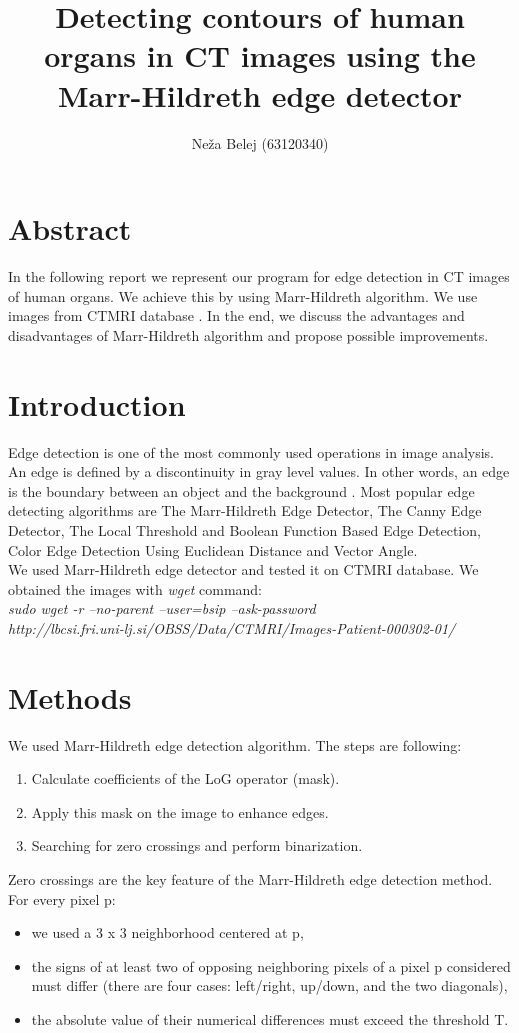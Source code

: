 \documentclass[a4paper,10pt]{article}
\title{Detecting contours of human organs in CT images using the Marr-Hildreth edge detector}
\author{Neža Belej (63120340)}
\begin{document}
\maketitle
\section {Abstract}
In the following report we represent our program for edge detection in CT images of human organs. We achieve this by using Marr-Hildreth algorithm. We use images from CTMRI database \cite{db}. In the end, we discuss the advantages and disadvantages of Marr-Hildreth algorithm and propose possible improvements.
\section{Introduction}
Edge detection is one of the most commonly used operations in image analysis. An edge is defined by a
discontinuity in gray level values. In other words, an edge is the boundary between an object and the background \cite{article1}. Most popular edge detecting algorithms are The Marr-Hildreth Edge Detector, The Canny Edge Detector, The Local Threshold and Boolean Function Based Edge Detection, Color Edge Detection Using Euclidean Distance and Vector Angle. \cite{article2}
\\
We used Marr-Hildreth edge detector and tested it on CTMRI database. We obtained the images with \textit{wget} command: \\

\textit{sudo wget -r --no-parent --user=bsip --ask-password \\ http://lbcsi.fri.uni-lj.si/OBSS/Data/CTMRI/Images-Patient-000302-01/}

\section{Methods}

We used Marr-Hildreth edge detection algorithm. The steps are following:
\begin{enumerate}
\item{Calculate coefficients of the LoG operator (mask).}
\item{Apply this mask on the image to enhance edges.}
\item{Searching for zero crossings and perform binarization.}
\end{enumerate}

Zero crossings are the key feature of the Marr-Hildreth edge detection method. For every pixel p:
\begin{itemize}
\item{we used a 3 x 3 neighborhood centered at p,}
\item{ the signs of at least two of opposing neighboring pixels of a pixel p considered must differ (there are four cases: left/right, up/down, and the two diagonals),}
\item{ the absolute value of their numerical differences must exceed the threshold T.}
\end{itemize}
\end{document}
